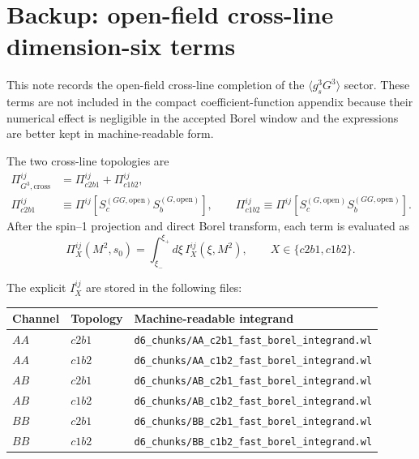 \documentclass[11pt]{article}
\begin{document}

\section*{Backup: open-field cross-line dimension-six terms}

This note records the open-field cross-line completion of the
\(\langle g_s^3G^3\rangle\) sector.  These terms are not included in the
compact coefficient-function appendix because their numerical effect is
negligible in the accepted Borel window and the expressions are better kept in
machine-readable form.

The two cross-line topologies are
\begin{align}
  \Pi^{ij}_{G^3,\mathrm{cross}} &=
  \Pi^{ij}_{c2b1}+\Pi^{ij}_{c1b2},\\
  \Pi^{ij}_{c2b1} &\equiv
  \Pi^{ij}\!\left[S_c^{(GG,\mathrm{open})}S_b^{(G,\mathrm{open})}\right],
  \qquad
  \Pi^{ij}_{c1b2} \equiv
  \Pi^{ij}\!\left[S_c^{(G,\mathrm{open})}S_b^{(GG,\mathrm{open})}\right].
\end{align}
After the spin--1 projection and direct Borel transform, each term is evaluated as
\begin{equation}
  \Pi^{ij}_{X}(M^2,s_0)
  =
  \int_{\xi_-}^{\xi_+}d\xi\,
  I^{ij}_{X}(\xi,M^2),
  \qquad X\in\{c2b1,c1b2\}.
\end{equation}

The explicit \(I^{ij}_{X}\) are stored in the following files:
\begin{center}
\begin{tabular}{lll}
\hline
Channel & Topology & Machine-readable integrand \\
\hline
\(AA\) & \(c2b1\) & \texttt{d6\_chunks/AA\_c2b1\_fast\_borel\_integrand.wl} \\
\(AA\) & \(c1b2\) & \texttt{d6\_chunks/AA\_c1b2\_fast\_borel\_integrand.wl} \\
\(AB\) & \(c2b1\) & \texttt{d6\_chunks/AB\_c2b1\_fast\_borel\_integrand.wl} \\
\(AB\) & \(c1b2\) & \texttt{d6\_chunks/AB\_c1b2\_fast\_borel\_integrand.wl} \\
\(BB\) & \(c2b1\) & \texttt{d6\_chunks/BB\_c2b1\_fast\_borel\_integrand.wl} \\
\(BB\) & \(c1b2\) & \texttt{d6\_chunks/BB\_c1b2\_fast\_borel\_integrand.wl} \\
\hline
\end{tabular}
\end{center}
\end{document}

